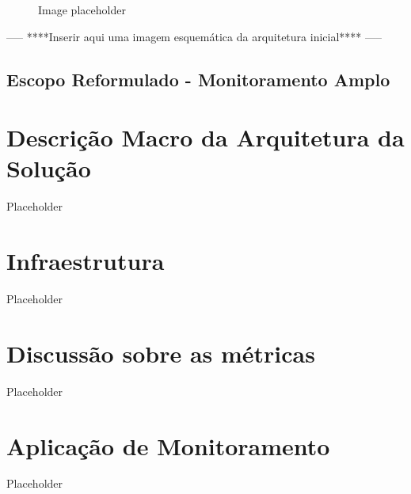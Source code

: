{\begin{figure}[H]
\centering
\fbox{\rule{0pt}{150pt} \rule{200pt}{0pt}} %
\caption{Image placeholder}
\label{fig:placeholder}
\end{figure}

-----
****Inserir aqui uma imagem esquemática da arquitetura inicial****
-----

\subsection{Escopo Reformulado - Monitoramento Amplo}
\label{subsection:EscopoReformulado}




}
\section{Descrição Macro da Arquitetura da Solução}

Placeholder

\section{Infraestrutura}

Placeholder

\section{Discussão sobre as métricas}

Placeholder

\section{Aplicação de Monitoramento}

Placeholder
